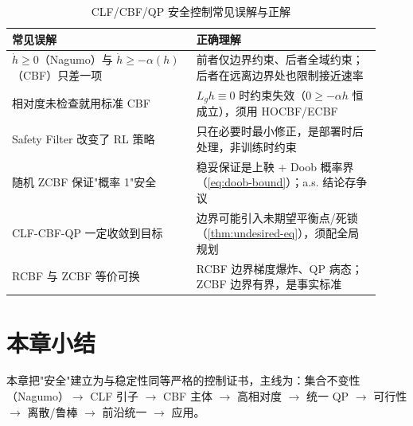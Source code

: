 \begin{table}[H]\centering\small
\caption{CLF/CBF/QP 安全控制常见误解与正解}
\label{tab:cbf-misconceptions}
\begin{tabular}{p{0.46\linewidth}p{0.46\linewidth}}
\toprule
\textbf{常见误解} & \textbf{正确理解} \\
\midrule
$\dot h\ge0$（Nagumo）与 $\dot h\ge-\alpha(h)$（CBF）只差一项 & 前者仅边界约束、后者全域约束；后者在远离边界处也限制接近速率 \\
相对度未检查就用标准 CBF & $L_gh\equiv0$ 时约束失效（$0\ge-\alpha h$ 恒成立），须用 HOCBF/ECBF \\
Safety Filter 改变了 RL 策略 & 只在必要时最小修正，是部署时后处理，非训练时约束 \\
随机 ZCBF 保证"概率 1"安全 & 稳妥保证是上鞅 + Doob 概率界（\cref{eq:doob-bound}）；a.s. 结论存争议 \\
CLF-CBF-QP 一定收敛到目标 & 边界可能引入未期望平衡点/死锁（\cref{thm:undesired-eq}），须配全局规划 \\
RCBF 与 ZCBF 等价可换 & RCBF 边界梯度爆炸、QP 病态；ZCBF 边界有界，是事实标准 \\
\bottomrule
\end{tabular}
\end{table}

\section*{本章小结}

本章把"安全"建立为与稳定性同等严格的控制证书，主线为：集合不变性（Nagumo）$\to$ CLF 引子 $\to$ CBF 主体 $\to$ 高相对度 $\to$ 统一 QP $\to$ 可行性 $\to$ 离散/鲁棒 $\to$ 前沿统一 $\to$ 应用。

